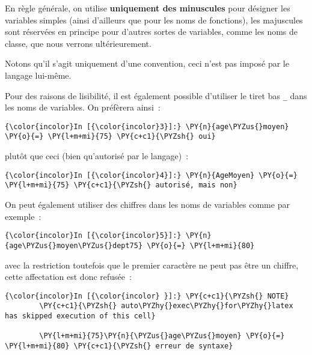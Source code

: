    En règle générale, on utilise \textbf{uniquement des minuscules} pour
désigner les variables simples (ainsi d'ailleurs que pour les noms de
fonctions), les majuscules sont réservées en principe pour d'autres
sortes de variables, comme les noms de classe, que nous verrons
ultérieurement.

Notons qu'il s'agit uniquement d'une convention, ceci n'est pas imposé
par le langage lui-même.

    Pour des raisons de lisibilité, il est également possible d'utiliser le
tiret bas \texttt{\_} dans les noms de variables. On préfèrera ainsi~:

    \begin{Verbatim}[commandchars=\\\{\}]
{\color{incolor}In [{\color{incolor}3}]:} \PY{n}{age\PYZus{}moyen} \PY{o}{=} \PY{l+m+mi}{75} \PY{c+c1}{\PYZsh{} oui}
\end{Verbatim}


    plutôt que ceci (bien qu'autorisé par le langage)~:

    \begin{Verbatim}[commandchars=\\\{\}]
{\color{incolor}In [{\color{incolor}4}]:} \PY{n}{AgeMoyen} \PY{o}{=} \PY{l+m+mi}{75} \PY{c+c1}{\PYZsh{} autorisé, mais non}
\end{Verbatim}


    On peut également utiliser des chiffres dans les noms de variables comme
par exemple~:

    \begin{Verbatim}[commandchars=\\\{\}]
{\color{incolor}In [{\color{incolor}5}]:} \PY{n}{age\PYZus{}moyen\PYZus{}dept75} \PY{o}{=} \PY{l+m+mi}{80}
\end{Verbatim}


    avec la restriction toutefois que le premier caractère ne peut pas être
un chiffre, cette affectation est donc refusée~:

    \begin{Verbatim}[commandchars=\\\{\}]
{\color{incolor}In [{\color{incolor} }]:} \PY{c+c1}{\PYZsh{} NOTE}
        \PY{c+c1}{\PYZsh{} auto\PYZhy{}exec\PYZhy{}for\PYZhy{}latex has skipped execution of this cell}
        
        \PY{l+m+mi}{75}\PY{n}{\PYZus{}age\PYZus{}moyen} \PY{o}{=} \PY{l+m+mi}{80} \PY{c+c1}{\PYZsh{} erreur de syntaxe}
\end{Verbatim}


